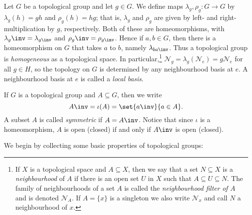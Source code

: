 \documentclass[article, a4paper, 11pt, oneside]{memoir}
\numberwithin{equation}{chapter}
\begin{document}
\newcommand{\leftmult}{\lambda}
\newcommand{\rightmult}{\rho}
\newcommand{\conjmult}{\gamma}

\newcommand{\calN}{\mathcal{N}}
\DeclarePairedDelimiter{\nhoodfilteraux}{(}{)}
\newcommand{\nhoodfilter}[1]{\calN_{#1}}

Let $G$ be a topological group and let $g \in G$. We define maps $\leftmult_g, \rightmult_g \colon G \to G$ by $\leftmult_g(h) = gh$ and $\rightmult_g(h) = hg$; that is, $\leftmult_g$ and $\rightmult_g$ are given by left- and right-multiplication by $g$, respectively. Both of these are homeomorphisms, with $\leftmult_g\inv = \leftmult_{g\inv}$ and $\rightmult_g\inv = \rightmult_{g\inv}$. Hence if $a, b \in G$, then there is a homeomorphism on $G$ that takes $a$ to $b$, namely $\leftmult_{ba\inv}$. Thus a topological group is \emph{homogeneous} as a topological space. In particular,\footnote{If $X$ is a topological space and $A \subseteq X$, then we say that a set $N \subseteq X$ is a \emph{neighbourhood} of $A$ if there is an open set $U$ in $X$ such that $A \subseteq U \subseteq N$. The family of neighbourhoods of a set $A$ is called the \emph{neighbourhood filter of $A$} and is denoted $\nhoodfilter{A}$. If $A = \{x\}$ is a singleton we also write $\nhoodfilter{x}$ and call $N$ a neighbourhood of $x$.} $\nhoodfilter{g} = \leftmult_g(\nhoodfilter{e}) = g\nhoodfilter{e}$ for all $g \in H$, so the topology on $G$ is determined by any neighbourhood basis at $e$. A neighbourhood basis at $e$ is called a \emph{local basis}.

If $G$ is a topological group and $A \subseteq G$, then we write
%
\begin{equation*}
    A\inv = \iota(A) = \set{a\inv}{a \in A}.
\end{equation*}
%
A subset $A$ is called \emph{symmetric} if $A = A\inv$. Notice that since $\iota$ is a homeomorphism, $A$ is open (closed) if and only if $A\inv$ is open (closed).

We begin by collecting some basic properties of topological groups:
\end{document}

